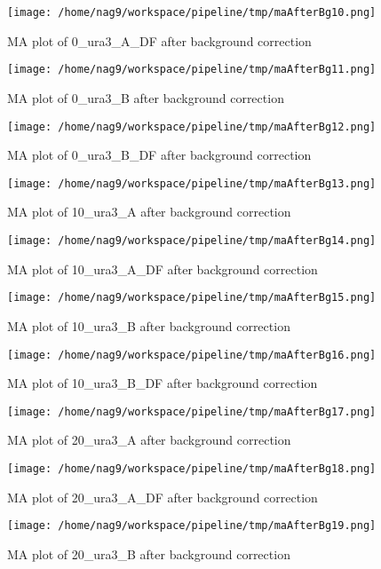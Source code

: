 \documentclass[titlepage]{article}
\begin{document}
\begin{figure}[htb!]
\centering
\texttt{[image: /home/nag9/workspace/pipeline/tmp/maAfterBg10.png]}
\caption{MA plot of 0\_ura3\_A\_DF after background correction}
\end{figure}\pagebreak
\begin{figure}[htb!]
\centering
\texttt{[image: /home/nag9/workspace/pipeline/tmp/maAfterBg11.png]}
\caption{MA plot of 0\_ura3\_B after background correction}
\end{figure}\pagebreak
\begin{figure}[htb!]
\centering
\texttt{[image: /home/nag9/workspace/pipeline/tmp/maAfterBg12.png]}
\caption{MA plot of 0\_ura3\_B\_DF after background correction}
\end{figure}\pagebreak
\begin{figure}[htb!]
\centering
\texttt{[image: /home/nag9/workspace/pipeline/tmp/maAfterBg13.png]}
\caption{MA plot of 10\_ura3\_A after background correction}
\end{figure}\pagebreak
\begin{figure}[htb!]
\centering
\texttt{[image: /home/nag9/workspace/pipeline/tmp/maAfterBg14.png]}
\caption{MA plot of 10\_ura3\_A\_DF after background correction}
\end{figure}\pagebreak
\begin{figure}[htb!]
\centering
\texttt{[image: /home/nag9/workspace/pipeline/tmp/maAfterBg15.png]}
\caption{MA plot of 10\_ura3\_B after background correction}
\end{figure}\pagebreak
\begin{figure}[htb!]
\centering
\texttt{[image: /home/nag9/workspace/pipeline/tmp/maAfterBg16.png]}
\caption{MA plot of 10\_ura3\_B\_DF after background correction}
\end{figure}\pagebreak
\begin{figure}[htb!]
\centering
\texttt{[image: /home/nag9/workspace/pipeline/tmp/maAfterBg17.png]}
\caption{MA plot of 20\_ura3\_A after background correction}
\end{figure}\pagebreak
\begin{figure}[htb!]
\centering
\texttt{[image: /home/nag9/workspace/pipeline/tmp/maAfterBg18.png]}
\caption{MA plot of 20\_ura3\_A\_DF after background correction}
\end{figure}\pagebreak
\begin{figure}[htb!]
\centering
\texttt{[image: /home/nag9/workspace/pipeline/tmp/maAfterBg19.png]}
\caption{MA plot of 20\_ura3\_B after background correction}
\end{figure}\pagebreak
\end{document}
